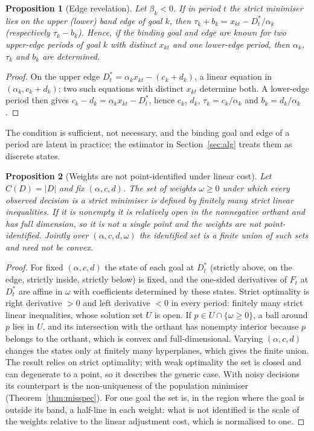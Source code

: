 \documentclass[11pt,a4paper]{article}
\newtheorem{proposition}{Proposition}
\theoremstyle{remark}\newtheorem{remark}{Remark}
\begin{document}
\begin{proposition}[Edge revelation]\label{prop:edge}
Let $\beta_k<0$. If in period $t$ the strict minimiser lies on the upper (lower) band edge of goal $k$, then $\tau_k+b_k=x_{kt}-D^*_t/\alpha_k$ (respectively $\tau_k-b_k$). Hence, if the binding goal and edge are known for two upper-edge periods of goal $k$ with distinct $x_{kt}$ and one lower-edge period, then $\alpha_k$, $\tau_k$ and $b_k$ are determined.
\end{proposition}
\begin{proof}
On the upper edge $D^*_t=\alpha_kx_{kt}-(c_k+d_k)$, a linear equation in $(\alpha_k,c_k+d_k)$; two such equations with distinct $x_{kt}$ determine both. A lower-edge period then gives $c_k-d_k=\alpha_kx_{kt}-D^*_t$, hence $c_k$, $d_k$, $\tau_k=c_k/\alpha_k$ and $b_k=d_k/\alpha_k$.
\end{proof}
The condition is sufficient, not necessary, and the binding goal and edge of a period are latent in practice; the estimator in Section~\ref{sec:alg} treats them as discrete states.

\begin{proposition}[Weights are not point-identified under linear cost]\label{prop:set}
Let $C(D)=|D|$ and fix $(\alpha,c,d)$. The set of weights $\omega\ge0$ under which every observed decision is a strict minimiser is defined by finitely many strict linear inequalities. If it is nonempty it is relatively open in the nonnegative orthant and has full dimension, so it is not a single point and the weights are not point-identified. Jointly over $(\alpha,c,d,\omega)$ the identified set is a finite union of such sets and need not be convex.
\end{proposition}
\begin{proof}
For fixed $(\alpha,c,d)$ the state of each goal at $D^*_t$ (strictly above, on the edge, strictly inside, strictly below) is fixed, and the one-sided derivatives of $F_t$ at $D^*_t$ are affine in $\omega$ with coefficients determined by these states. Strict optimality is right derivative $>0$ and left derivative $<0$ in every period: finitely many strict linear inequalities, whose solution set $U$ is open. If $p\in U\cap\{\omega\ge0\}$, a ball around $p$ lies in $U$, and its intersection with the orthant has nonempty interior because $p$ belongs to the orthant, which is convex and full-dimensional. Varying $(\alpha,c,d)$ changes the states only at finitely many hyperplanes, which gives the finite union. The result relies on strict optimality; with weak optimality the set is closed and can degenerate to a point, so it describes the generic case. With noisy decisions its counterpart is the non-uniqueness of the population minimiser (Theorem~\ref{thm:misspec}). For one goal the set is, in the region where the goal is outside its band, a half-line in each weight: what is not identified is the scale of the weights relative to the linear adjustment cost, which is normalised to one.
\end{proof}
\end{document}
